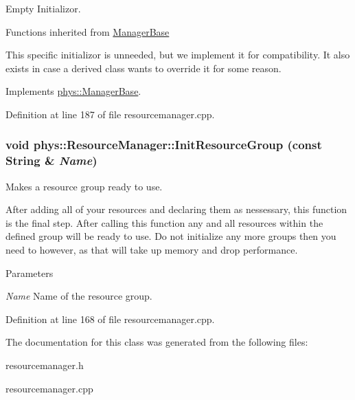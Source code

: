 Empty Initializor. 

Functions inherited from \hyperlink{classphys_1_1ManagerBase}{ManagerBase}

This specific initializor is unneeded, but we implement it for compatibility. It also exists in case a derived class wants to override it for some reason. 

Implements \hyperlink{classphys_1_1ManagerBase_a57dd8e54e767427d5bdcc86dc66d73ed}{phys::ManagerBase}.



Definition at line 187 of file resourcemanager.cpp.

\hypertarget{classphys_1_1ResourceManager_aa2f44129dfc3dc0b0ee332a2bba6078d}{
\subsubsection[{InitResourceGroup}]{\setlength{\rightskip}{0pt plus 5cm}void phys::ResourceManager::InitResourceGroup (const {\bf String} \& {\em Name})}}
\label{d1/d35/classphys_1_1ResourceManager_aa2f44129dfc3dc0b0ee332a2bba6078d}


Makes a resource group ready to use. 

After adding all of your resources and declaring them as nessessary, this function is the final step. After calling this function any and all resources within the defined group will be ready to use. Do not initialize any more groups then you need to however, as that will take up memory and drop performance. 
\begin{DoxyParams}{Parameters}
\item[{\em Name}]Name of the resource group. \end{DoxyParams}


Definition at line 168 of file resourcemanager.cpp.



The documentation for this class was generated from the following files:\begin{DoxyCompactItemize}
\item 
resourcemanager.h\item 
resourcemanager.cpp\end{DoxyCompactItemize}
